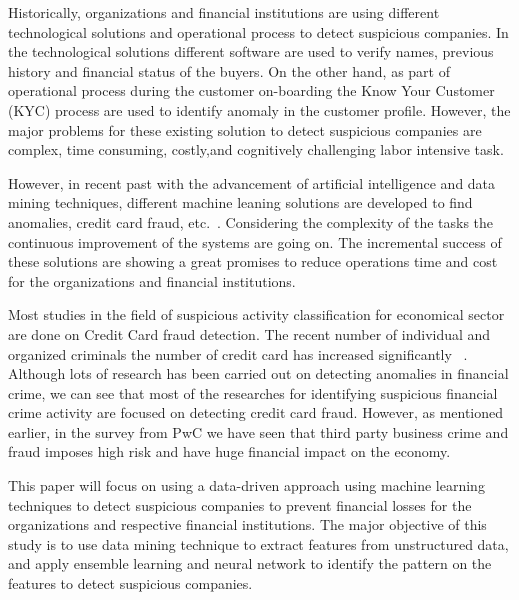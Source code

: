 Historically, organizations and financial institutions are using different technological solutions and operational process to detect suspicious companies. In the technological solutions different software are used to verify names, previous history and financial status of the buyers. On the other hand, as part of operational process during the customer on-boarding the Know Your Customer (KYC) process are used to identify anomaly in the customer profile. However, the major problems for these existing solution to detect suspicious companies are complex, time consuming, costly,and cognitively challenging labor intensive task.


However, in recent past with the advancement of artificial intelligence and data mining techniques, different machine leaning solutions are developed to find anomalies, credit card fraud, etc.~\cite{RB2021, KIRKOS2007995}. Considering the complexity of the tasks the continuous improvement of the systems are going on. The incremental success of these solutions are showing a great promises to reduce operations time and cost for the organizations and financial institutions.

Most studies in the field of suspicious activity classification for economical sector are done on Credit Card fraud detection. The recent number of individual and organized criminals the number of credit card has increased significantly ~\cite{RB2021}. Although lots of research has been carried out on detecting anomalies in financial crime, we can see that most of the researches for identifying suspicious financial crime activity are focused on detecting credit card fraud. However, as mentioned earlier, in the survey from PwC we have seen that third party business crime and fraud imposes high risk and have huge financial impact on the economy.


This paper will focus on using a data-driven approach using machine learning techniques to detect suspicious companies to prevent financial losses for the organizations and respective financial institutions.  The major objective of this study is to use data mining technique to extract features from unstructured data, and apply ensemble learning and neural network to identify the pattern on the features to detect suspicious companies.




